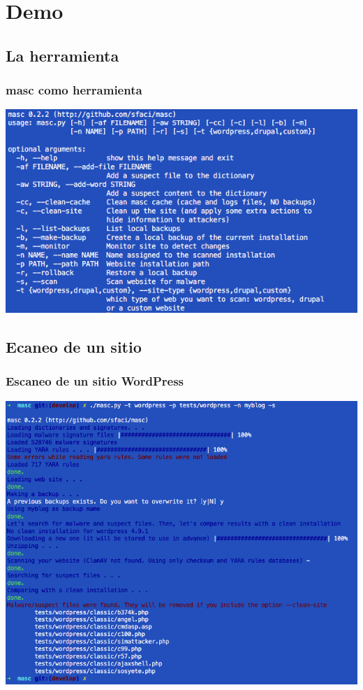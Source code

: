 \documentclass[xcolor={dvipsnames}]{beamer}
\begin{document}
\section{Demo}
\subsection{La herramienta}
\begin{frame}\frametitle{masc como herramienta}
    \includegraphics[scale=0.4]{options}
\end{frame}

\subsection{Ecaneo de un sitio}
\begin{frame}\frametitle{Escaneo de un sitio WordPress}
    \includegraphics[scale=0.3]{wordpress_scan}
\end{frame}
\end{document}
